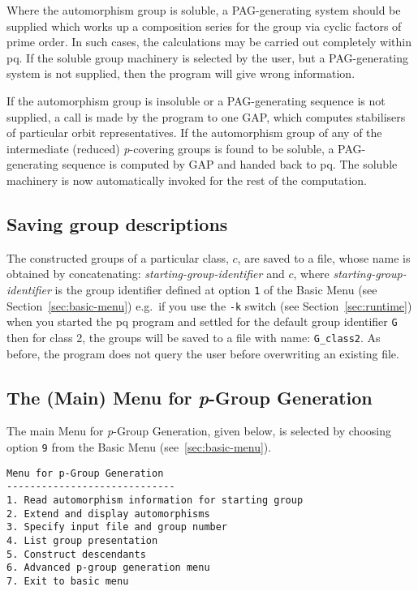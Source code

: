 \documentclass[12pt]{article}
\begin{document}
Where the automorphism group is soluble, a PAG-generating system should 
be supplied which works up a composition series for the group via 
cyclic factors of prime order. In such cases, the calculations may be
carried out completely within pq.  If the soluble 
group machinery is selected by the user, but a PAG-generating system is 
not supplied, then the program will give wrong information.

If the automorphism group is insoluble or a PAG-generating sequence 
is not supplied, a call is made by the program to one {\sf GAP},
which computes stabilisers of particular orbit representatives.
If the automorphism group of any of the intermediate (reduced) 
{\it p}-covering groups is found to be soluble, a PAG-generating sequence 
is computed by {\sf GAP} and handed back to pq.  The soluble machinery 
is now automatically invoked for the rest of the computation.

\subsection{Saving group descriptions}
The constructed groups of a particular class, $c$, are saved to a file,
whose name is obtained by concatenating: 
\textit{starting-group-identifier} and $c$, where
\textit{starting-group-identifier} is the group identifier defined at option
\texttt{1} of the Basic Menu (see Section~\ref{sec:basic-menu})
e.g.~if you use the \texttt{-k} switch (see Section~\ref{sec:runtime})
when you started the pq program and settled for the default group identifier
\texttt{G} then for class 2, the groups will be saved to a file with name:
\texttt{G\_class2}. As before, the 
program does not query the user before overwriting an existing file.

\subsection{The (Main) Menu for {\it p}-Group Generation}
\label{sec:pgrp-gen-main-menu}
The main Menu for {\it p}-Group Generation, given below, is selected by
choosing option \texttt{9} from the Basic Menu (see~\ref{sec:basic-menu}).
\pagebreak
\begin{verbatim}
Menu for p-Group Generation
-----------------------------
1. Read automorphism information for starting group
2. Extend and display automorphisms
3. Specify input file and group number
4. List group presentation
5. Construct descendants
6. Advanced p-group generation menu
7. Exit to basic menu
\end{verbatim}
\end{document}

